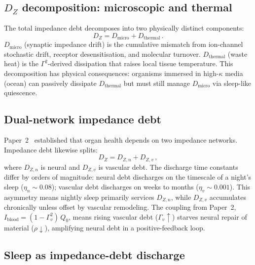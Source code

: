 \documentclass[aps,pre,twocolumn,superscriptaddress,floatfix]{revtex4-2}
\begin{document}
\subsection{$D_Z$ decomposition: microscopic and thermal}
\label{sec:DZ-decomp}

The total impedance debt decomposes into two physically
distinct components:
\begin{equation}
  D_Z = D_{\mathrm{micro}} + D_{\mathrm{thermal}}\,.
  \label{eq:DZ-decomp}
\end{equation}
$D_{\mathrm{micro}}$ (synaptic impedance drift) is the
cumulative mismatch from ion-channel stochastic drift,
receptor desensitisation, and molecular turnover.
$D_{\mathrm{thermal}}$ (waste heat) is the $\Gamma^2$-derived
dissipation that raises local tissue temperature.
This decomposition has physical consequences:
organisms immersed in high-$\kappa$ media (ocean) can
passively dissipate $D_{\mathrm{thermal}}$ but must still
manage $D_{\mathrm{micro}}$ via sleep-like quiescence.


\subsection{Dual-network impedance debt}
\label{sec:dual-network-debt}

Paper~2~\cite{Paper2} established that organ health depends
on two impedance networks.
Impedance debt likewise splits:
\begin{equation}
  D_Z = D_{Z,n} + D_{Z,v}\,,
  \label{eq:DZ-dual}
\end{equation}
where $D_{Z,n}$ is neural and $D_{Z,v}$ is vascular debt.
The discharge time constants differ by orders of magnitude:
neural debt discharges on the timescale of a night's sleep
($\eta_n \sim 0.08$);
vascular debt discharges on weeks to months
($\eta_v \sim 0.001$).
This asymmetry means nightly sleep primarily services
$D_{Z,n}$, while $D_{Z,v}$ accumulates chronically
unless offset by vascular remodeling.
The coupling from Paper~2,
$I_{\mathrm{blood}} = (1-\Gamma_v^2)\,Q_0$,
means rising vascular debt ($\Gamma_v\!\uparrow$) starves
neural repair of material ($\rho\!\downarrow$),
amplifying neural debt in a positive-feedback loop.


\subsection{Sleep as impedance-debt discharge}
\label{sec:sleep}
\end{document}
